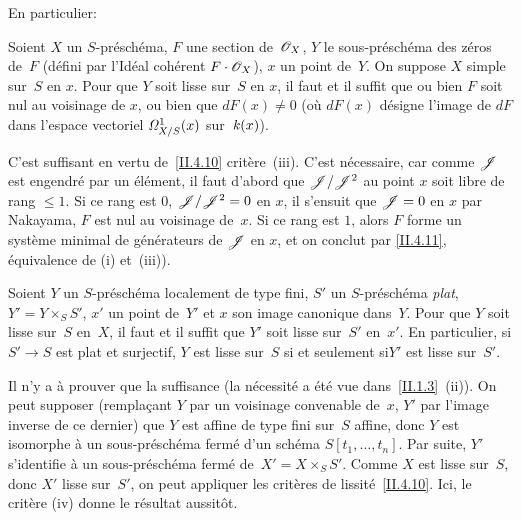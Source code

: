 En
particulier:

\begin{corollaire}
\label{II.4.12}
Soient $X$ un $S$-pr\'esch\'ema, $F$ une section de~$\cal{O}_X$,
$Y$ le sous-pr\'esch\'ema des z\'eros de~$F$ (d\'efini par
l'Id\'eal coh\'erent $F\cdot\cal{O}_X$), $x$ un point de~$Y$. On
suppose $X$ simple sur~$S$ en $x$. Pour que $Y$ soit lisse sur~$S$ en
$x$, il faut et il suffit que ou bien $F$ soit nul au voisinage de
$x$, ou bien que $dF(x) \neq 0$ (o\`u $dF(x)$ d\'esigne l'image de
$dF$ dans l'espace vectoriel $\it{\Omega}^1_{X/S}(x)$ sur~$\kres(x)$).
\end{corollaire}

C'est suffisant en vertu de~\ref{II.4.10} crit\`ere~(iii). C'est
n\'ecessaire, car comme $\cal{J}$ est engendr\'e par un
\'el\'ement, il faut d'abord que $\cal{J}/\cal{J}^2$ au point $x$
soit libre de rang $\leq 1$. Si ce rang est $0$,
\ie $\cal{J}/\cal{J}^2=0$ en $x$, il s'ensuit que $\cal{J}=0$ en $x$
par Nakayama, \ie $F$ est nul au voisinage de~$x$. Si ce rang est
$1$, alors $F$ forme un syst\`eme minimal de g\'en\'erateurs de
$\cal{J}$ en $x$, et on conclut par \eqref{II.4.11}, \'equivalence de
(i) et~(iii)).
\begin{corollaire}
\label{II.4.13}
Soient $Y$ un $S$-pr\'esch\'ema localement de type fini, $S'$ un
$S$-pr\'e\-sch\'ema \emph{plat}, $Y'=Y \times_S S'$, $x'$ un point
de~$Y'$ et $x$ son image canonique dans~$Y$. Pour que $Y$ soit lisse
sur~$S$ en~$X$, il faut et il suffit que $Y'$ soit lisse sur~$S'$ en~$x'$. En particulier, si $S'\to S$ est plat et surjectif, $Y$ est
lisse sur~$S$
si et seulement si\xspace $Y'$ est lisse sur~$S'$.
\end{corollaire}

Il n'y a \`a prouver que la suffisance (la n\'ecessit\'e a
\'et\'e vue dans~\ref{II.1.3}~(ii)). On peut supposer (rempla\c cant $Y$ par un voisinage convenable de~$x$, $Y'$ par l'image inverse
de ce dernier) que $Y$ est affine de type fini sur~$S$ affine, donc
$Y$ est isomorphe \`a un sous-pr\'esch\'ema ferm\'e d'un
sch\'ema $S[t_1,\dots,t_n]$. Par suite, $Y'$ s'identifie \`a un
sous-pr\'esch\'ema ferm\'e de~$X'=X \times_S S'$. Comme $X$ est
lisse sur~$S$, donc $X'$ lisse sur~$S'$, on peut appliquer les
crit\`eres de lissit\'e~\ref{II.4.10}. Ici, le crit\`ere (iv)
donne le r\'esultat aussit\^ot.

